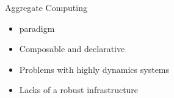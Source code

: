 \begin{frame}{Aggregate Computing~\cite{aggregatecomputing}}
  \begin{cardTiny}
    \begin{itemize}
      \item[\success{\faThumbsUp}]  paradigm
      \item[\success{\faThumbsUp}] Composable and declarative 
      \item[{\color{materialRed} \faThumbsDown}] Problems with highly dynamics systems
      \item[{\color{materialRed} \faThumbsDown}] Lacks of a robust infrastructure
    \end{itemize}
  \end{cardTiny}

  \begin{columns}
    \begin{column}{0.51\textwidth}
    \end{column}
    \begin{column}{0.35\textwidth}
    \end{column}
  \end{columns}
\end{frame}